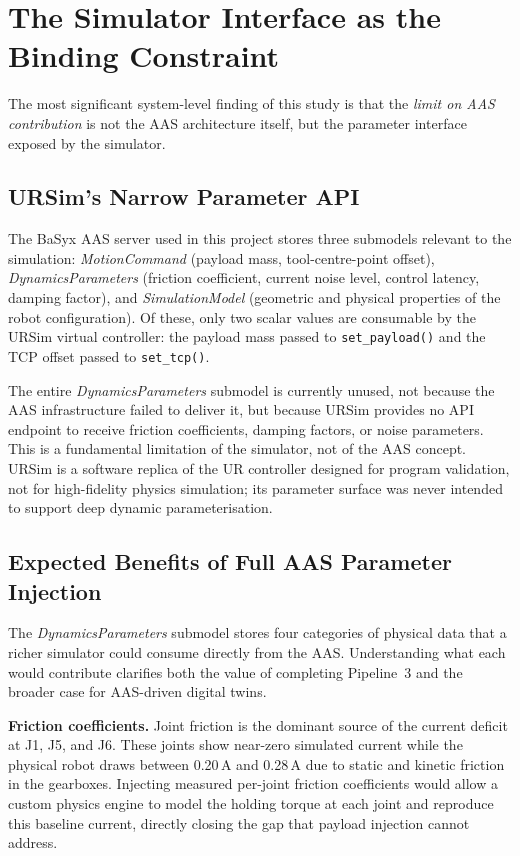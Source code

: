 \section{The Simulator Interface as the Binding Constraint}
\label{sec:discussion_interface}

The most significant system-level finding of this study is that the \emph{limit on AAS
contribution} is not the AAS architecture itself, but the parameter interface exposed by the
simulator.

\subsection{URSim's Narrow Parameter API}

The BaSyx AAS server used in this project stores three submodels relevant to the simulation:
\textit{MotionCommand} (payload mass, tool-centre-point offset), \textit{DynamicsParameters}
(friction coefficient, current noise level, control latency, damping factor), and
\textit{SimulationModel} (geometric and physical properties of the robot configuration).
Of these, only two scalar values are consumable by the URSim virtual controller: the payload
mass passed to \texttt{set\_payload()} and the TCP offset passed to \texttt{set\_tcp()}.

The entire \textit{DynamicsParameters} submodel is currently unused, not because the AAS
infrastructure failed to deliver it, but because URSim provides no API endpoint to receive
friction coefficients, damping factors, or noise parameters.
This is a fundamental limitation of the simulator, not of the AAS concept.
URSim is a software replica of the UR controller designed for program validation, not for
high-fidelity physics simulation; its parameter surface was never intended to support
deep dynamic parameterisation.

\subsection{Expected Benefits of Full AAS Parameter Injection}

The \textit{DynamicsParameters} submodel stores four categories of physical data that a
richer simulator could consume directly from the AAS.
Understanding what each would contribute clarifies both the value of completing Pipeline~3
and the broader case for AAS-driven digital twins.

\textbf{Friction coefficients.}
Joint friction is the dominant source of the current deficit at J1, J5, and J6.
These joints show near-zero simulated current while the physical robot draws between 0.20\,A
and 0.28\,A due to static and kinetic friction in the gearboxes.
Injecting measured per-joint friction coefficients would allow a custom physics engine to
model the holding torque at each joint and reproduce this baseline current, directly closing
the gap that payload injection cannot address.

